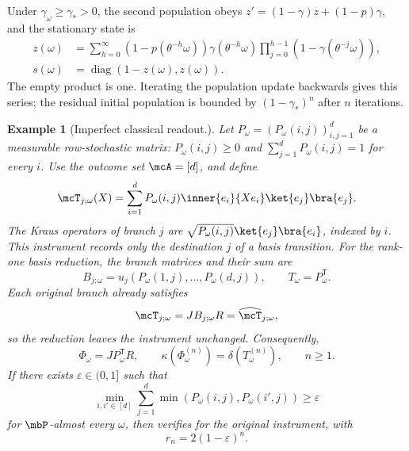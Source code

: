 \documentclass[a4paper]{article}
\numberwithin{equation}{section}   %
\theoremstyle{plain}   %
\theoremstyle{plain}   %
\theoremstyle{examplestyle}
\newtheorem{example}{Example}
\DeclareMathOperator{\pr}{\mbP}           %
\begin{document}
            Under $\gamma_\omega\ge\gamma_*>0$, the second population obeys
            $z'=(1-\gamma)z+(1-p)\gamma$, and the stationary state is
            \begin{equation}
            \label{eq:GAD-stationary-population}
             \begin{aligned}
                 z(\omega)&=\sum_{h=0}^{\infty}
                 (1-p(\theta^{-h}\omega))\gamma(\theta^{-h}\omega)
                 \prod_{j=0}^{h-1}(1-\gamma(\theta^{-j}\omega)),\\
                 s(\omega)&=\operatorname{diag}(1-z(\omega),z(\omega)).
             \end{aligned}
            \end{equation}
            The empty product is one. Iterating the population update backwards gives this series; the residual initial population is bounded by $(1-\gamma_*)^n$ after $n$ iterations.

    \begin{example}[Imperfect classical readout.]
    \label{eg:imperfect-classical-readout}
        Let $P_\omega=(P_\omega(i,j))_{i,j=1}^d$ be a measurable row-stochastic matrix: $P_\omega(i,j)\ge0$ and  $\sum_{j=1}^dP_\omega(i,j)=1$ for every $i$.
        Use the outcome set $\mcA = [d]$, and define
        \[
            \mcT_{j;\omega}(X)
            =\sum_{i=1}^d P_\omega(i,j)\inner{e_i}{Xe_i}
                                 \ket{e_j}\bra{e_j}.
        \]
        The Kraus operators of branch $j$ are $\sqrt{P_\omega(i,j)}\ket{e_j}\bra{e_i}$, indexed by $i$.
        This instrument records only the destination $j$ of a basis transition.
        For the rank-one basis reduction, the branch matrices and their sum are
        \[
             B_{j;\omega}
             =u_j\left(P_\omega(1,j),\ldots,P_\omega(d,j)\right),
             \qquad
             T_\omega=P_\omega^{\mathsf T}.
        \]
        Each original branch already satisfies
        \[
             \mcT_{j;\omega}
             =JB_{j;\omega}R
             =\widehat{\mcT}_{j;\omega},
        \]
        so the reduction leaves the instrument unchanged.
        Consequently,
        \[
             \Phi_\omega=JP_\omega^{\mathsf T}R,
             \qquad
             \kappa(\Phi_\omega^{(n)})
             =\delta(T_\omega^{(n)}),
             \qquad n\ge1.
        \]
        If there exists $\varepsilon\in(0,1]$ such that
        \[
             \min_{i,i'\in[d]}
             \sum_{j=1}^d
             \min\left(P_\omega(i,j),P_\omega(i',j)\right)
             \ge\varepsilon
        \]
        for $\pr$-almost every $\omega$, then  verifies  for the original instrument,   with
        \[
            r_n=2(1-\varepsilon)^n.
        \]
    \end{example}
\end{document}
